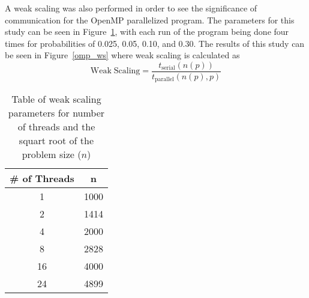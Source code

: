 \documentclass[11pt]{article}
\begin{document}
\noindent A weak scaling was also performed in order to see the significance of communication for the OpenMP parallelized program. The parameters for this study can be seen in Figure~\ref{mpi_ws_tab}, with each run of the program being done four times for probabilities of 0.025, 0.05, 0.10, and 0.30. The results of this study can be seen in Figure~\ref{omp_ws} where weak scaling is calculated as
\begin{equation}
\mathrm{Weak \; Scaling} = \frac{t_{\mathrm{serial}}(n(p))}{t_{\mathrm{parallel}}(n(p),p)}
\label{ws}
\end{equation}
\begin{table}[h]
	\begin{center}
		\begin{tabular}{|c| c|}
			\hline
			\# of Threads & n \\ \hline
			1 & 1000 \\ \hline
			2 & 1414 \\ \hline
			4 & 2000 \\ \hline
			8 & 2828 \\ \hline
			16 & 4000 \\ \hline
			24 & 4899 \\ \hline
		\end{tabular}
	\end{center}
	\caption{Table of weak scaling parameters for number of threads and the squart root of the problem size ($n$)}
	\label{mpi_ws_tab}
\end{table}
\end{document}
